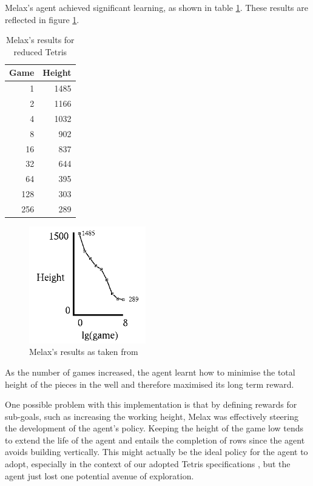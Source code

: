 \documentclass{rucsthesis}
\begin{document}
Melax's agent achieved significant learning, as shown in table \ref{mresults}. These results are reflected in figure \ref{fig:meres}.

\begin{table}[h]
\centering
\begin{tabular}{|r|r|}
\hline
Game & Height  \\
\hline
    1 &  1485 \\
     2  & 1166 \\
     4  & 1032 \\
     8  &  902 \\
    16  &  837 \\
    32  &  644 \\
    64  &  395 \\
   128  &  303 \\
   256   & 289 \\
\hline
\end{tabular}
\caption{Melax's results for reduced Tetris}
\label{mresults}
\end{table}

\begin{figure}[h]
\centering
\includegraphics[width=2in]{melaxresults.png}
\caption{Melax's results as taken from \cite{melaxtetris}}
\label{fig:meres}
\end{figure}

As the number of games increased, the agent learnt how to minimise the total height of the pieces in the well and therefore maximised its long term reward.

One possible problem with this implementation is that by defining rewards for sub-goals, such as increasing the working height, Melax was effectively steering the development of the agent's policy. Keeping the height of the game low tends to extend the life of the agent and entails the completion of rows since the agent avoids building vertically. This might actually be the ideal policy for the agent to adopt, especially in the context of our adopted Tetris specifications \citep{tetstand}, but the agent just lost one potential avenue of exploration. 
\end{document}
